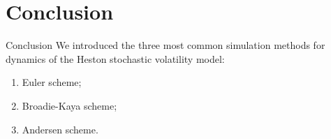 \documentclass{vegapresentation}
\begin{document}
    \section{Conclusion}
        \begin{frame}{Conclusion}
            We introduced the three most common simulation methods for dynamics of the Heston stochastic volatility model:
            \begin{enumerate}
                \item Euler scheme; \\
                \item Broadie-Kaya scheme; \\
                \item Andersen scheme.
            \end{enumerate}
        \end{frame}
\end{document}
